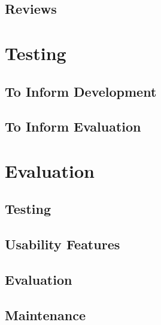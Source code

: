 ﻿\documentclass{article}
\begin{document}
    \subsection{Reviews}
    
    
    \section{Testing}
    \subsection{To Inform Development}
    \subsection{To Inform Evaluation}
    
    
    \section{Evaluation}
    \subsection{Testing}
    \subsection{Usability Features}
    \subsection{Evaluation}
    \subsection{Maintenance}
\end{document}
